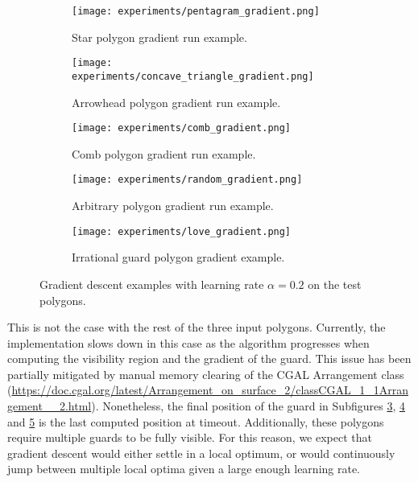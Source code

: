\begin{figure}[h!]
    \centering
    \begin{subfigure}{0.45\textwidth}
        \centering
        \texttt{[image: experiments/pentagram\_gradient.png]}
        \caption{Star polygon gradient run example.}
        \label{fig:star_gradient}
    \end{subfigure}
    \begin{subfigure}{0.45\textwidth}
        \centering
        \texttt{[image: experiments/concave\_triangle\_gradient.png]}
        \caption{Arrowhead polygon gradient run example.}
        \label{fig:concave_gradient}
    \end{subfigure}
    \begin{subfigure}{0.45\textwidth}
        \centering
        \texttt{[image: experiments/comb\_gradient.png]}
        \caption{Comb polygon gradient run example.}
        \label{fig:comb_gradient}
    \end{subfigure}
    \begin{subfigure}{0.45\textwidth}
        \centering
        \texttt{[image: experiments/random\_gradient.png]}
        \caption{Arbitrary polygon gradient run example.}
        \label{fig:random_gradient}
    \end{subfigure}
    \begin{subfigure}{\textwidth}
        \centering
        \texttt{[image: experiments/love\_gradient.png]}
        \caption{Irrational guard polygon gradient example.}
        \label{fig:love_gradient}
    \end{subfigure}
    \caption{Gradient descent examples with learning rate $\alpha = 0.2$ on the test polygons.}
    \label{fig:gradients}
\end{figure}

This is not the case with the rest of the three input polygons. Currently, the implementation slows down in this case as the algorithm progresses when computing the visibility region and the gradient of the guard. This issue has been partially mitigated by manual memory clearing of the CGAL Arrangement class (\url{https://doc.cgal.org/latest/Arrangement_on_surface_2/classCGAL_1_1Arrangement__2.html}). Nonetheless, the final position of the guard in Subfigures \ref{fig:comb_gradient}, \ref{fig:random_gradient} and \ref{fig:love_gradient} is the last computed position at timeout. Additionally, these polygons require multiple guards to be fully visible. For this reason, we expect that gradient descent would either settle in a local optimum, or would continuously jump between multiple local optima given a large enough learning rate.


